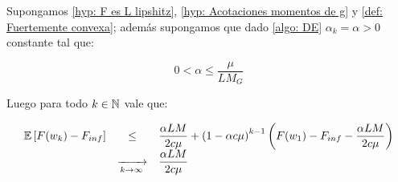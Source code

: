 \begin{theorem}
	\label{theorem: DE en fuertemente convexo y alfa fijo converge en l1}
	Supongamos \ref{hyp: F es L lipshitz}, \ref{hyp: Acotaciones momentos de g} y \ref{def: Fuertemente convexa}; adem\'as supongamos que dado \ref{algo: DE} $\alpha_k = \alpha >0 $ constante tal que:
	
	\begin{equation}
	\label{eq: Condicion alfa Conv L1 fuertemente convexo}
	0  < \alpha \leq \dfrac{\mu}{LM_G} 
	\end{equation}
	
	Luego para todo $k \in {\mathbb{N}}$ vale que:
	
	\begin{equation*}
	\begin{array}{rcl}
	\mathbb{E} \left[F(w_k) - F_{inf}\right] & \leq & \dfrac{\alpha LM}{2 c \mu} + \left(1 - \alpha c \mu \right)^{k-1} \left(F(w_1) - F_{inf} - \dfrac{\alpha LM}{2 c \mu} \right) \\
	& \xrightarrow[k \rightarrow \infty]{} & \dfrac{\alpha LM}{2 c \mu} 
	\end{array}
	\end{equation*}
	 
\end{theorem}

